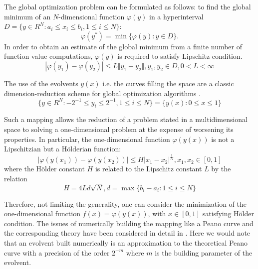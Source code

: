 \documentclass[procedia]{easychair}
\begin{document}
The global optimization problem can be formulated as follows: to find the global minimum of an
\(N\)-dimensional function \(\varphi(y)\) in a hyperinterval
\(D=\{y\in R^N:a_i\leqslant x_i\leqslant{b_i}, 1\leqslant{i}\leqslant{N}\}\):
\begin{displaymath}
  \varphi(y^*)=\min\{\varphi(y):y\in D\}.
\end{displaymath}
In order to obtain an estimate of the global minimum from a finite number of function value computations,
 \(\varphi(y)\) is required to satisfy Lipschitz condition.
\begin{displaymath}
\label{lip}
|\varphi(y_1)-\varphi(y_2)|\leqslant L\Vert y_1-y_2\Vert,y_1,y_2\in D,0<L<\infty
\end{displaymath}
\par
The use of the evolvents \(y(x)\) i.e. the curves filling the space are a classic
dimension-reduction scheme for global optimization algorithms \cite{evolvents2013}.
\begin{displaymath}
\label{cube}
\lbrace y\in R^N:-2^{-1}\leqslant y_i\leqslant 2^{-1},1\leqslant i\leqslant N\rbrace=\{y(x):0\leqslant x\leqslant 1\}
\end{displaymath}
\par
Such a mapping allows the reduction of a problem stated in a multidimensional space
to solving a one-dimensional problem at the expense of worsening its properties.
In particular, the one-dimensional function \(\varphi(y(x))\) is not a Lipschitzian but a Hölderian function:
\begin{displaymath}
\label{holder}
|\varphi(y(x_1))-\varphi(y(x_2))|\leqslant H{|x_1-x_2|}^{\frac{1}{N}},x_1,x_2\in[0,1]
\end{displaymath}
where the Hölder constant \(H\) is related to the Lipschitz constant \(L\) by the relation
\begin{displaymath}
H=4Ld\sqrt{N},d=\max\{b_i-a_i:1\leqslant i\leqslant N\}
\end{displaymath}
\par
Therefore, not limiting the generality, one can consider the minimization of the
one-dimensional function \(f(x)=\varphi(y(x))\), with \(x\in[0,1]\) satisfying Hölder condition.
The issues of numerically building the mapping like a Peano curve and the corresponding
theory have been considered in detail in \cite{evolvents2013}. Here we would note that an evolvent
built numerically is an approximation to the theoretical Peano curve with a precision
of the order \(2^{-m}\) where \(m\) is the building parameter of the evolvent.
\end{document}
